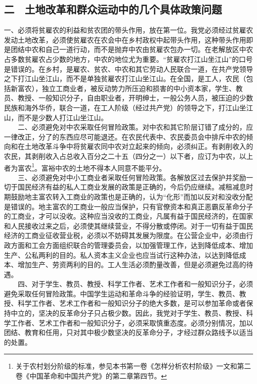 \documentclass[cn,11pt,chinese]{elegantbook}
\def\myformat#1{\hfil\hfil #1}
\begin{document}
\subsection*{\myformat{二　土地改革和群众运动中的几个具体政策问题}}
一、必须将贫雇农的利益和贫农团的带头作用，放在第一位。我党必须经过贫雇农发动土地改革，必须使贫雇农在农会中在乡村政权中起带头作用，这种带头作用即是团结中农和自己一道行动，而不是抛弃中农由贫雇农包办一切。在老解放区中农占多数贫雇农占少数的地方，中农的地位尤为重要。“贫雇农打江山坐江山”的口号是错误的。在乡村，是雇农、贫农、中农和其它劳动人民联合一道，在共产党领导之下打江山坐江山，而不是单独贫雇农打江山坐江山。在全国，是工人，农民（包括新富农），独立工商业者，被反动势力所压迫和损害的中小资本家，学生、教员、教授、一般知识分子，自由职业者，开明绅士，一般公务人员，被压迫的少数民族和海外华侨，联合一道，在工人阶级（经过共产党）的领导之下，打江山坐江山，而不是少数人打江山坐江山。\\
　　二、必须避免对中农采取任何冒险政策。对中农和其它阶层订错了成分的，应一律改正，分了的东西应尽可能退还。在农民代表中、农民委员会中排斥中农的倾向和在土地改革斗争中将贫雇农同中农对立起来的倾向，必须纠正。有剥削收入的农民，其剥削收入占总收入百分之二十五（四分之一）以下者，应订为中农，以上者为富农\footnote[1]{ 关于农村划分阶级的标准，参见本书第一卷《怎样分析农村阶级》一文和第二卷《中国革命和中国共产党》的第二章第四节。}。富裕中农的土地不得本人同意不能平分。\\
　　三、必须避免对中小工商业者采取任何冒险政策。各解放区过去保护并奖励一切于国民经济有益的私人工商业发展的政策是正确的，今后仍应继续。减租减息时期鼓励地主富农转入工商业的政策也是正确的，认为“化形”而加以反对和没收分配是错误的。地主富农的工商业一般应当保护，只有官僚资本和真正恶霸反革命分子的工商业，才可以没收。这种应当没收的工商业，凡属有益于国民经济的，在国家和人民接收过来之后，必须使其继续营业，不得分散或停闭。对于一切有益于国民经济的工商业征收营业税，必须以不妨碍其发展为限度。在公营企业中，必须由行政方面和工会方面组织联合的管理委员会，以加强管理工作，达到降低成本、增加生产、公私两利的目的。私人资本主义企业也应当试行这种办法，以达到降低成本、增加生产、劳资两利的目的。工人生活必须酌量改善，但是必须避免过高的待遇。\\
　　四、对于学生、教员、教授、科学工作者、艺术工作者和一般知识分子，必须避免采取任何冒险政策。中国学生运动和革命斗争的经验证明，学生、教员、教授、科学工作者、艺术工作者和一般知识分子的绝大多数，是可以参加革命或者保持中立的，坚决的反革命分子只占极少数。因此，我党对于学生、教员、教授、科学工作者、艺术工作者和一般知识分子，必须采取慎重态度。必须分别情况，加以团结、教育和任用，只对其中极少数坚决的反革命分子，才经过群众路线予以适当的处置。\\
\end{document}
